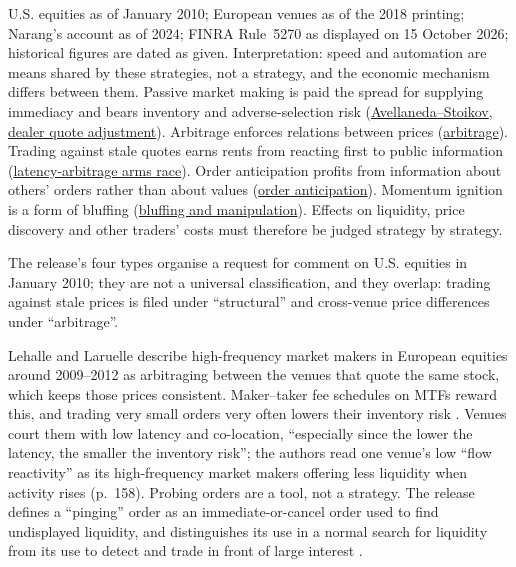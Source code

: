 \begin{qfdefinition}
 U.S. equities as of January 2010; European venues as of the 2018 printing; Narang's account as of 2024; FINRA Rule~5270 as displayed on 15 October 2026; historical figures are dated as given. Interpretation: speed and automation are means shared by these strategies, not a strategy, and the economic mechanism differs between them. Passive market making is paid the spread for supplying immediacy and bears inventory and adverse-selection risk (\hyperref[mod:avellaneda-stoikov]{Avellaneda--Stoikov}, \hyperref[meth:dealer-quote-adjustment]{dealer quote adjustment}). Arbitrage enforces relations between prices (\hyperref[def:arbitrage]{arbitrage}). Trading against stale quotes earns rents from reacting first to public information (\hyperref[res:latency-arbitrage-arms-race]{latency-arbitrage arms race}). Order anticipation profits from information about others' orders rather than about values (\hyperref[def:order-anticipation]{order anticipation}). Momentum ignition is a form of bluffing (\hyperref[def:bluffing-manipulation]{bluffing and manipulation}). Effects on liquidity, price discovery and other traders' costs must therefore be judged strategy by strategy.

The release's four types organise a request for comment on U.S. equities in January 2010; they are not a universal classification, and they overlap: trading against stale prices is filed under ``structural'' and cross-venue price differences under ``arbitrage''.

 Lehalle and Laruelle describe high-frequency market makers in European equities around 2009--2012 as arbitraging between the venues that quote the same stock, which keeps those prices consistent. Maker--taker fee schedules on MTFs reward this, and trading very small orders very often lowers their inventory risk \citep[secs.~2.4 and~2.4.3, pp.~158 and~163]{alpha-laruelle}. Venues court them with low latency and co-location, ``especially since the lower the latency, the smaller the inventory risk''; the authors read one venue's low ``flow reactivity'' as its high-frequency market makers offering less liquidity when activity rises (p.~158). Probing orders are a tool, not a strategy. The release defines a ``pinging'' order as an immediate-or-cancel order used to find undisplayed liquidity, and distinguishes its use in a normal search for liquidity from its use to detect and trade in front of large interest \citep[p.~47, n.~69]{sec-concept-release-2010}.


\end{qfdefinition}
